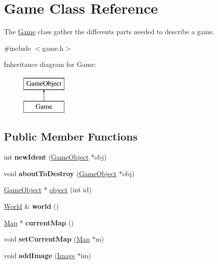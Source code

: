\hypertarget{class_game}{\section{\-Game \-Class \-Reference}
\label{class_game}
}


\-The \hyperlink{class_game}{\-Game} class gather the differents parts needed to describe a game.  




{\ttfamily \#include $<$game.\-h$>$}

\-Inheritance diagram for \-Game\-:\begin{figure}[H]
\begin{center}
\leavevmode
\includegraphics[height=2.000000cm]{class_game}
\end{center}
\end{figure}
\subsection*{\-Public \-Member \-Functions}
\begin{DoxyCompactItemize}
\item 
\hypertarget{class_game_ae64a3a16c7460ff0709ff5935ac0b0dd}{int {\bfseries new\-Ident} (\hyperlink{class_game_object}{\-Game\-Object} $\ast$obj)}\label{class_game_ae64a3a16c7460ff0709ff5935ac0b0dd}

\item 
\hypertarget{class_game_a944eb939fcae4546db1ef3b9bc199417}{void {\bfseries about\-To\-Destroy} (\hyperlink{class_game_object}{\-Game\-Object} $\ast$obj)}\label{class_game_a944eb939fcae4546db1ef3b9bc199417}

\item 
\hyperlink{class_game_object}{\-Game\-Object} $\ast$ \hyperlink{class_game_afc34f1c4cf865c1af7acc4b30ba44cb9}{object} (int id)
\item 
\hypertarget{class_game_a505763c778d70a1f03fbb3d231394b8a}{\hyperlink{class_world}{\-World} \& {\bfseries world} ()}\label{class_game_a505763c778d70a1f03fbb3d231394b8a}

\item 
\hypertarget{class_game_a3b242dcb7703b409692ce0c91e799a8c}{\hyperlink{class_map}{\-Map} $\ast$ {\bfseries current\-Map} ()}\label{class_game_a3b242dcb7703b409692ce0c91e799a8c}

\item 
\hypertarget{class_game_af7394ea8ff98b0b819125a6bac47db2b}{void {\bfseries set\-Current\-Map} (\hyperlink{class_map}{\-Map} $\ast$m)}\label{class_game_af7394ea8ff98b0b819125a6bac47db2b}

\item 
\hypertarget{class_game_a8c246c639e16c351b7f261dc44a0897d}{void {\bfseries add\-Image} (\hyperlink{class_image}{\-Image} $\ast$im)}\label{class_game_a8c246c639e16c351b7f261dc44a0897d}

\end{DoxyCompactItemize}


